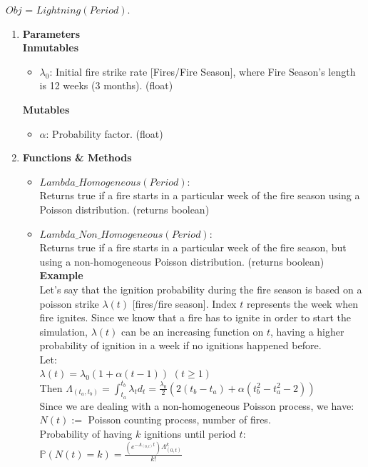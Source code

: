 \documentclass[11pt]{article}
\begin{document}
\begin{enumerate}
$Obj$ = $Lightning(Period)$.
\begin{enumerate}
	\item \textbf{Parameters}\\
	\textbf{Inmutables}
		\begin{itemize}
			\item $\lambda_0$: Initial fire strike rate [Fires/Fire Season], where Fire Season's length is 12 weeks (3 months). \hfill (float) 
		\end{itemize}
	\textbf{Mutables}
		\begin{itemize}
			\item $\alpha$: Probability factor. \hfill (float) \\
		\end{itemize}
	\item \textbf{Functions \& Methods}
		\begin{itemize}
			\item $Lambda\_Homogeneous(Period)$: \\ Returns true if a fire starts in a particular week of the fire season using a Poisson distribution. \hfill (returns boolean)
			\item $Lambda\_Non\_Homogeneous(Period)$: \\ Returns true if a fire starts in a particular week of the fire season, but using a non-homogeneous Poisson distribution. \hfill (returns boolean) \\ 
			
			\textbf{Example} \\
			Let's say that the ignition probability during the fire season is based on a poisson strike $\lambda(t)$ [fires/fire season]. Index $t$ represents the week when fire ignites. Since we know that a fire has to ignite in order to start the simulation, $\lambda(t)$ can be an increasing function on $t$, having a higher probability of ignition in a week if no ignitions happened before. \\
			
			Let: \\
			$\lambda(t) = \lambda_0(1+\alpha(t-1))$ \hspace{0.5 cm} $(t\geq 1)$ \\ Then $\Lambda_{(t_{a},t_{b})} = \int_{t_a}^{t_b} \lambda_{t}d_{t} = \frac{\lambda_{0}}{2}(2(t_{b}-t_{a})+\alpha(t_{b}^{2}-t_{a}^{2}-2))$  \\
			
			Since we are dealing with a non-homogeneous Poisson process, we have: \\
			$N(t):=$ Poisson counting process, number of fires.\\
			Probability of having $k$ ignitions until period $t$: $\mathbb{P}(N(t)=k) = \frac{(e^{-\Lambda_{(0,t)} t}) \Lambda_{(0,t)}^k}{k!} $ \\
			

\end{itemize}
\end{enumerate}
\end{enumerate}
\end{document}
